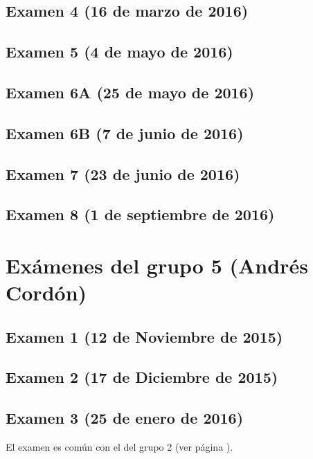\documentclass[a4paper,12pt,twoside]{book}
\begin{document}
\subsection{Examen 4 (16 de marzo de 2016)}
\subsection{Examen 5 (4 de mayo de 2016)}
\subsection{Examen 6A (25 de mayo de 2016)}
\subsection{Examen 6B (7 de junio de 2016)} 
 \label{examen_15_16_4_6}
\subsection{Examen 7 (23 de junio de 2016)}
  \label{examen_15_16_4_7}
\subsection{Examen 8 (1 de septiembre de 2016)}
  \label{examen_15_16_4_8}

\section{Exámenes del grupo 5 (Andrés Cordón)}
\subsection{Examen 1 (12 de Noviembre de 2015)}
\subsection{Examen 2 (17 de Diciembre de 2015)}
\subsection{Examen 3 (25 de enero de 2016)}
El examen es común con el del grupo 2 (ver página \pageref{examen_15_16_2_3}).
\end{document}
